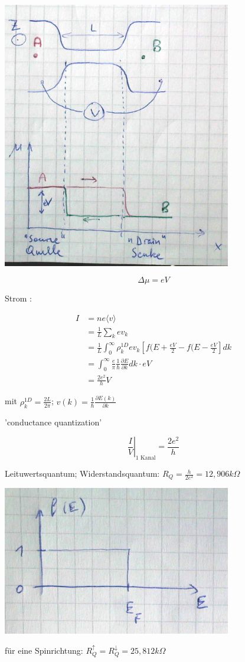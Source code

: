 \includegraphics[width=0.75\textwidth]{kap11_04.png}

\[\Delta \mu = eV\]

Strom : 

\begin{align}
I &= ne\langle  v\rangle \\
&= \frac{1}{L}\sum_k ev_k \\
&= \frac{1}{L}\int_0^{\infty} \rho^{1D}_{k} ev_k\left[f(E+\frac{eV}{2}-f(E-\frac{eV}{2}\right]dk \\
&=\int_0^{\infty}\frac{e}{\pi}\frac{1}{\hbar}\frac{\partial E}{\partial k}dk\cdot eV \\
&=\frac{2e^2}{h}V
\end{align}

mit \(\rho^{1D}_k=\frac{2L}{2\pi}\); \(v(k)=\frac{1}{\hbar}\frac{\partial E(k)}{\partial k}\)

'conductance quantization' 

\[\left.\frac{I}{V}\right|_{\text{1 Kanal}} = \frac{2e^2}{h}\]

Leituwertsquantum; Widerstandsquantum: \(R_Q=\frac{h}{2e^2}=12,906 k\Omega\)

\includegraphics[width=0.75\textwidth]{kap11_05.png}


für eine Spinrichtung: \(R^\uparrow_Q =R^\downarrow_Q =25,812 k\Omega \)






